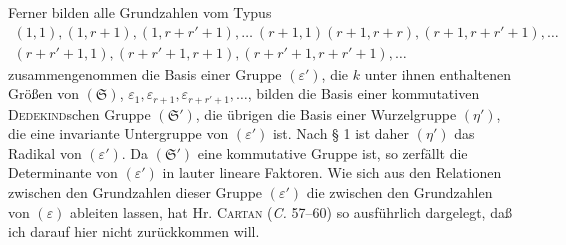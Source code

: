 \documentclass[11pt]{article}
\newcommand{\eps}{\varepsilon}
\newcommand{\grS}{\mathfrak{S}}
\begin{document}
Ferner bilden alle Grundzahlen vom Typus
\[
\begin{gathered}
 (1,1),(1,r+1),(1,r+r'+1),\ldots\ (r+1,1)(r+1,r+r),(r+1,r+r'+1),\ldots \\
 (r+r'+1,1),(r+r'+1,r+1),(r+r'+1,r+r'+1),\ldots
\end{gathered}
\]
zusammengenommen die Basis einer Gruppe $(\eps')$, die $k$ unter ihnen enthaltenen Größen von $(\grS)$, $\eps_1,\eps_{r+1},\eps_{r+r'+1},\ldots$, bilden die Basis einer kommutativen \textsc{Dedekind}schen Gruppe $(\grS')$, die übrigen die Basis einer Wurzelgruppe $(\eta')$, die eine invariante Untergruppe von $(\eps')$ ist. Nach § 1 ist daher $(\eta')$ das Radikal von $(\eps')$. Da $(\grS')$ eine kommutative Gruppe ist, so zerfällt die Determinante von $(\eps')$ in lauter lineare Faktoren. Wie sich aus den Relationen zwischen den Grundzahlen dieser Gruppe $(\eps')$ die zwischen den Grundzahlen von $(\eps)$ ableiten lassen, hat Hr. \textsc{Cartan} (\emph{C.} 57--60) so ausführlich dargelegt, daß ich darauf hier nicht zurückkommen will.
\end{document}
